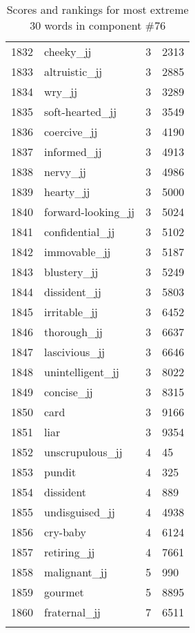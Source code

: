 \begin{longtable}[!htbp]{| rlr@{.}l |}
    1832 & cheeky\_jj & 3 & 2313 \\
    1833 & altruistic\_jj & 3 & 2885 \\
    1834 & wry\_jj & 3 & 3289 \\
    1835 & soft-hearted\_jj & 3 & 3549 \\
    1836 & coercive\_jj & 3 & 4190 \\
    1837 & informed\_jj & 3 & 4913 \\
    1838 & nervy\_jj & 3 & 4986 \\
    1839 & hearty\_jj & 3 & 5000 \\
    1840 & forward-looking\_jj & 3 & 5024 \\
    1841 & confidential\_jj & 3 & 5102 \\
    1842 & immovable\_jj & 3 & 5187 \\
    1843 & blustery\_jj & 3 & 5249 \\
    1844 & dissident\_jj & 3 & 5803 \\
    1845 & irritable\_jj & 3 & 6452 \\
    1846 & thorough\_jj & 3 & 6637 \\
    1847 & lascivious\_jj & 3 & 6646 \\
    1848 & unintelligent\_jj & 3 & 8022 \\
    1849 & concise\_jj & 3 & 8315 \\
    1850 & card & 3 & 9166 \\
    1851 & liar & 3 & 9354 \\
    1852 & unscrupulous\_jj & 4 & 45 \\
    1853 & pundit & 4 & 325 \\
    1854 & dissident & 4 & 889 \\
    1855 & undisguised\_jj & 4 & 4938 \\
    1856 & cry-baby & 4 & 6124 \\
    1857 & retiring\_jj & 4 & 7661 \\
    1858 & malignant\_jj & 5 & 990 \\
    1859 & gourmet & 5 & 8895 \\
    1860 & fraternal\_jj & 7 & 6511 \\
    \hline
    \caption{Scores and rankings for most extreme 30 words in component \#76} \\
\end{longtable}
